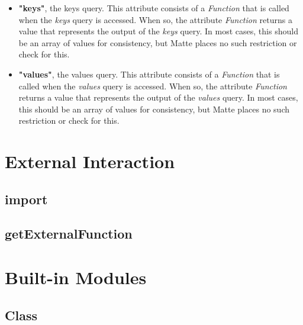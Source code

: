 \documentclass[12pt,letterpaper]{report}
\begin{document}
\begin{itemize}


  \item \textbf{"keys"}, the keys query. This attribute consists of a \textit{Function} that 
  is called when the \textit{keys} query is accessed. When so, the attribute \textit{Function}
  returns a value that represents the output of the \textit{keys} query. In most cases, this 
  should be an array of values for consistency, but Matte places no such restriction or check 
  for this.
  


  \item \textbf{"values"}, the values query. This attribute consists of a \textit{Function} that 
  is called when the \textit{values} query is accessed. When so, the attribute \textit{Function}
  returns a value that represents the output of the \textit{values} query. In most cases, this 
  should be an array of values for consistency, but Matte places no such restriction or check 
  for this.
  


\end{itemize}


\chapter{External Interaction}\label{External Interaction}
\section{import}\label{import}
\section{getExternalFunction}\label{getExternalFunction}
\chapter{Built-in Modules}\label{Built-in Modules}
\section{Class}\label{Class}
\end{document}
